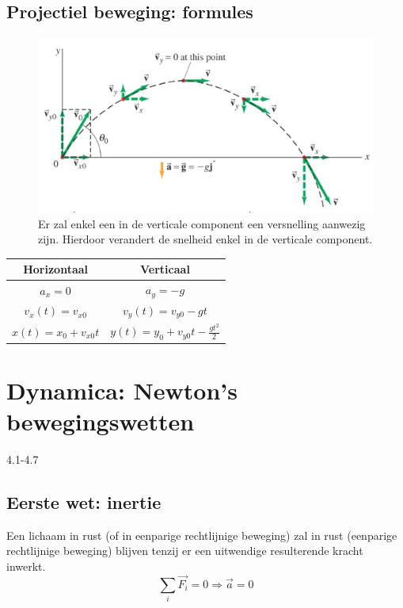 \documentclass[12pt,a4paper]{article}
\begin{document}
    \subsection{Projectiel beweging: formules}
    \begin{figure}[h]
        \centering
        \includegraphics[width=0.7\linewidth]{projectiel}
        \caption{Er zal enkel een in de verticale component een versnelling aanwezig zijn. Hierdoor verandert de snelheid enkel in de verticale component.}
        \label{projectiel}
    \end{figure}
    \begin{table}[h]
        \centering
        \begin{tabular}{|c|c|}
            \hline
            \textbf{Horizontaal}     & \textbf{Verticaal}                        \\
            \hline
            \(a_x = 0\)              & \(a_y = -g\)                              \\
            \hline
            \(v_x(t) = v_{x0}\)      & \(v_y(t) = v_{y0} - gt\)                  \\
            \hline
            \(x(t) = x_0 + v_{x0}t\) & \(y(t) = y_0 + v_{y0}t - \frac{gt^2}{2}\) \\
            \hline
        \end{tabular}
    \end{table}


    \section{Dynamica: Newton's bewegingswetten}
    4.1-4.7

    \subsection{Eerste wet: inertie}
    Een lichaam in rust (of in eenparige rechtlijnige beweging) zal in rust (eenparige rechtlijnige beweging) blijven tenzij er een uitwendige resulterende kracht inwerkt.
    \[\sum_{i}\vec{F_i} = 0 \Rightarrow \vec{a} = 0\]
\end{document}
